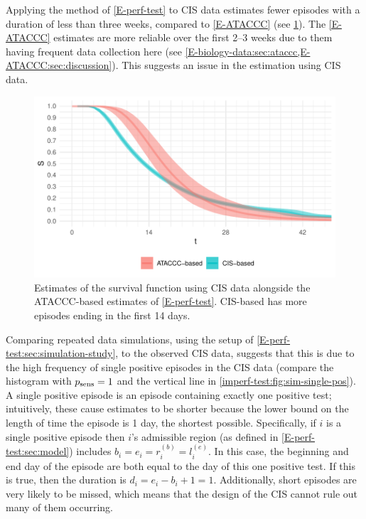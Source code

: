\documentclass[thesis.tex]{subfiles}
\begin{document}
Applying the method of \cref{E-perf-test} to CIS data estimates fewer episodes with a duration of less than three weeks, compared to \cref{E-ATACCC} (see \cref{imperf-test:fig:problem-cis-estimates}).
The \cref{E-ATACCC} estimates are more reliable over the first 2--3 weeks due to them having frequent data collection here (see \cref{E-biology-data:sec:ataccc,E-ATACCC:sec:discussion}).
This suggests an issue in the estimation using CIS data.
\begin{figure}
  \centering \includegraphics{cis-imperfect-testing/CIS_perfect}
  \caption[Estimating survival using CIS data assuming perfect testing]{Estimates of the survival function using CIS data alongside the ATACCC-based estimates of \cref{E-perf-test}. CIS-based has more episodes ending in the first 14 days. \label{imperf-test:fig:problem-cis-estimates}}
\end{figure}

Comparing repeated data simulations, using the setup of \cref{E-perf-test:sec:simulation-study}, to the observed CIS data, suggests that this is due to the high frequency of single positive episodes in the CIS data (compare the histogram with $p_\text{sens}=1$ and the vertical line in \cref{imperf-test:fig:sim-single-pos}).
A single positive episode is an episode containing exactly one positive test; intuitively, these cause estimates to be shorter because the lower bound on the length of time the episode is 1 day, the shortest possible.
Specifically, if $i$ is a single positive episode then $i$'s admissible region (as defined in \cref{E-perf-test:sec:model}) includes $b_i = e_i = r_i^{(b)} = l_i^{(e)}$.
In this case, the beginning and end day of the episode are both equal to the day of this one positive test.
If this is true, then the duration is $d_i = e_i - b_i + 1 = 1$.
Additionally, short episodes are very likely to be missed, which means that the design of the CIS cannot rule out many of them occurring.
\end{document}
